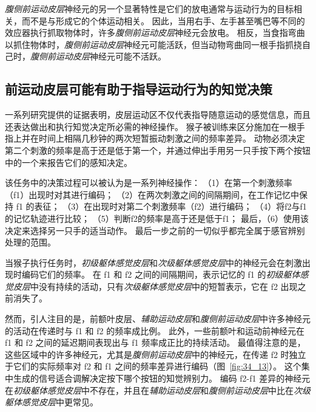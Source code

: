 \textit{腹侧前运动皮层}神经元的另一个显著特性是它们的放电通常与运动行为的目标相关，而不是与形成它的个体运动相关。
因此，当用右手、左手甚至嘴巴等不同的效应器执行抓取物体时，许多\textit{腹侧前运动皮层}神经元会放电。
相反，当食指弯曲以抓住物体时，\textit{腹侧前运动皮层}神经元可能活跃，但当动物弯曲同一根手指抓挠自己时，\textit{腹侧前运动皮层}神经元可能不活跃。



\subsection{前运动皮层可能有助于指导运动行为的知觉决策}

一系列研究提供的证据表明，皮层运动区不仅代表指导随意运动的感觉信息，而且还表达做出和执行知觉决定所必需的神经操作。
猴子被训练来区分施加在一根手指上并在时间上相隔几秒钟的两次短暂振动刺激之间的频率差异。
动物必须决定第二个刺激的频率是高于还是低于第一个，并通过伸出手用另一只手按下两个按钮中的一个来报告它们的感知决定。


该任务中的决策过程可以被认为是一系列神经操作：
（1）在第一个刺激频率（f1）出现时对其进行编码；
（2）在两次刺激之间的间隔期间，在工作记忆中保持 f1 的表征；
（3）在出现时对第二个刺激频率（f2）进行编码；
（4）将f2与f1的记忆轨迹进行比较；
（5）判断f2的频率是高于还是低于f1；
最后，（6）使用该决定来选择另一只手的适当动作。
最后一步之前的一切似乎都完全属于感官辨别处理的范围。


当猴子执行任务时，\textit{初级躯体感觉皮层}和\textit{次级躯体感觉皮层}中的神经元会在刺激出现时编码它们的频率。
在 f1 和 f2 之间的间隔期间，表示记忆的 f1 的\textit{初级躯体感觉皮层}中没有持续的活动，只有\textit{次级躯体感觉皮层}中的短暂表示，它在 f2 出现之前消失了。


然而，引人注目的是，前额叶皮层、\textit{辅助运动皮层}和\textit{腹侧前运动皮层}中许多神经元的活动在传递时与 f1 和 f2 的频率成比例。
此外，一些前额叶和运动前神经元在 f1 和 f2 之间的延迟期间表现出与 f1 频率成正比的持续活动。
最值得注意的是，这些区域中的许多神经元，尤其是\textit{腹侧前运动皮层}中的神经元，在传递 f2 时独立于它们的实际频率对 f2 和 f1 之间的频率差异进行编码（图~\ref{fig:34_13}）。 
这个集中生成的信号适合调解决定按下哪个按钮的知觉辨别力。
编码 f2-f1 差异的神经元在\textit{初级躯体感觉皮层}中不存在，并且在\textit{辅助运动皮层}和\textit{腹侧前运动皮层}中比在\textit{次级躯体感觉皮层}中更常见。


